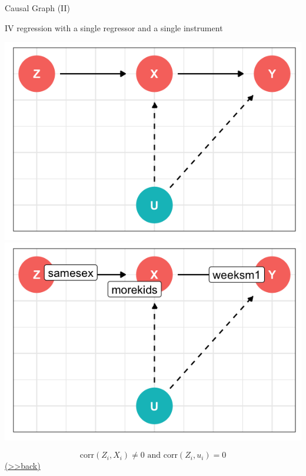 \documentclass[
  10pt,
  ignorenonframetext,
]{beamer}
\begin{document}
\begin{frame}{Causal Graph (II)}
\protect\hypertarget{IVCG}{}
\begin{block}{IV regression with a single regressor and a single
instrument}
\protect\hypertarget{iv-regression-with-a-single-regressor-and-a-single-instrument-1}{}
\begin{center}\includegraphics[width=0.48\linewidth,height=0.4\textheight]{pictures/IVsetting1} \includegraphics[width=0.48\linewidth,height=0.4\textheight]{pictures/IVsetting2} \end{center}

\[
\text{corr}(Z_i, X_i) \neq 0 \text{ and } \text{corr}(Z_i, u_i)  = 0
\] \footnotesize\protect\hyperlink{IVQ}{(\textgreater\textgreater back)}
\normalsize
\end{block}
\end{frame}
\end{document}
